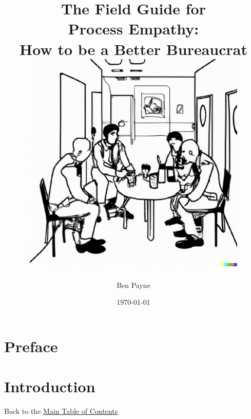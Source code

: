 \documentclass{book}
\title{\Huge The Field Guide for\\ Process Empathy:\\
How to be a Better Bureaucrat\\
\vfill
\includegraphics[width=0.8\textwidth]{images/bureaucrat_empathizing_with_coworkers_in_office_breakroom.pdf}
}
\author{\Huge Ben Payne}
\date{\today}
\begin{document}





\begin{titlepage}
\maketitle
\thispagestyle{empty}
\end{titlepage}
\clearpage

\frontmatter %

\clearpage

\dominitoc %
\hypertarget{contents}{}
\tableofcontents\label{sec:toc}

\chapter{Preface}
\clearpage

\mainmatter %



\newif\ifpageref
\newif\ifsectionref
\pagereffalse
\sectionreffalse

\newtoggle{pageref}
\newtoggle{sectionref}

\togglefalse{pageref}
\togglefalse{sectionref}



\chapter{Introduction\label{sec:introduction}}
{\footnotesize Back to the \hyperref[sec:toc]{Main Table of Contents}}
\minitoc
  
\end{document}

